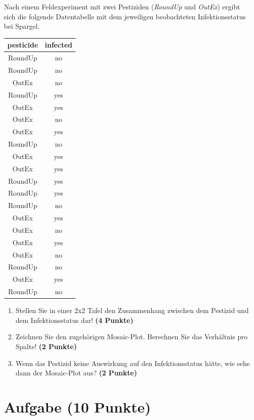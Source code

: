 \documentclass[a4paper, 9pt]{scrartcl}\usepackage[]{graphicx}\usepackage[]{xcolor}
\begin{document}
Nach einem Feldexperiment mit zwei Pestiziden (\textit{RoundUp} und
\textit{OutEx}) ergibt sich die folgende Datentabelle mit dem jeweiligen
beobachteten Infektionsstatus bei Spargel.

\begin{table}[!h]
\centering
\begin{tabular}{cc}
\toprule
pesticide & infected\\
\midrule
RoundUp & no\\
RoundUp & no\\
OutEx & no\\
RoundUp & yes\\
OutEx & yes\\
\addlinespace
OutEx & no\\
OutEx & yes\\
RoundUp & no\\
OutEx & yes\\
OutEx & yes\\
\addlinespace
RoundUp & yes\\
RoundUp & yes\\
RoundUp & no\\
OutEx & yes\\
OutEx & no\\
\addlinespace
OutEx & yes\\
OutEx & no\\
RoundUp & no\\
OutEx & yes\\
RoundUp & no\\
\bottomrule
\end{tabular}
\end{table}



\begin{enumerate}
\item Stellen Sie in einer 2x2 Tafel den Zusammenhang zwischen dem
  Pestizid und dem Infektionsstatus dar! \textbf{(4 Punkte)}
\item Zeichnen Sie den zugeh{\"o}rigen Mosaic-Plot. Berechnen Sie das
  Verh{\"a}ltnis pro Spalte! \textbf{(2 Punkte)}
\item Wenn das Pestizid keine Auswirkung auf den Infektionsstatus h{\"a}tte, wie
  sehe dann der Mosaic-Plot aus? \textbf{(2 Punkte)}
\end{enumerate} 
\clearpage

\section{Aufgabe \hfill (10 Punkte)}
\end{document}
